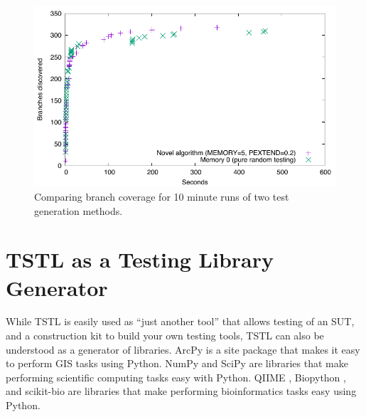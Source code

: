 \begin{figure}
\includegraphics[width=\columnwidth]{memory}
\caption{Comparing branch coverage for 10 minute runs of two test generation methods.}
\label{fig:compare}
\end{figure}

\section{TSTL as a Testing Library Generator}
\label{sec:langext}

While TSTL is easily used as ``just another tool'' that allows testing of an SUT, and a construction kit to build your own testing tools, TSTL can also be understood as a generator of libraries.  ArcPy is a site package that makes it easy to perform GIS tasks using Python.  NumPy \cite{NumPy} and SciPy \cite{SciPy} are libraries that make performing scientific computing tasks easy with Python.  QIIME \cite{QIIME}, Biopython \cite{biopython}, and scikit-bio \cite{scikitbio} are libraries that make performing bioinformatics tasks easy using Python.  